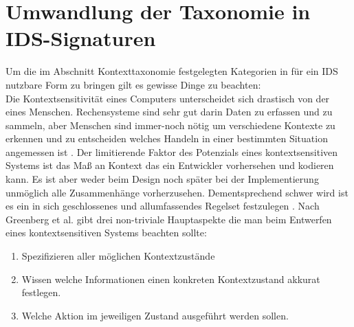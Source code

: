 	

\section{Umwandlung der Taxonomie in IDS-Signaturen} 

Um die im Abschnitt Kontexttaxonomie festgelegten Kategorien in für ein IDS nutzbare Form zu bringen gilt es gewisse Dinge zu beachten:\\ Die Kontextsensitivität eines Computers unterscheidet sich drastisch von der eines Menschen. Rechensysteme sind sehr gut darin Daten zu erfassen und zu sammeln, aber Menschen sind immer-noch nötig um verschiedene Kontexte zu erkennen und zu entscheiden welches Handeln in einer bestimmten Situation angemessen ist \cite{dey_understanding_2001}.
Der limitierende Faktor des Potenzials eines kontextsensitiven Systems ist das Maß an Kontext das ein Entwickler vorhersehen und kodieren kann.
Es ist aber weder beim Design noch später bei der Implementierung unmöglich alle Zusammenhänge vorherzusehen.
Dementsprechend schwer wird ist es ein in sich geschlossenes und allumfassendes Regelset festzulegen \cite{perera_context_2014}.
 Nach Greenberg et al. \cite{greenberg2001context} gibt drei non-triviale Hauptaspekte die man beim Entwerfen eines kontextsensitiven Systems beachten sollte: 
\begin{enumerate}
\item{Spezifizieren aller möglichen Kontextzustände}
\item{Wissen welche Informationen einen konkreten Kontextzustand akkurat festlegen.}
\item{Welche Aktion im jeweiligen Zustand ausgeführt werden sollen.}
\end{enumerate}
